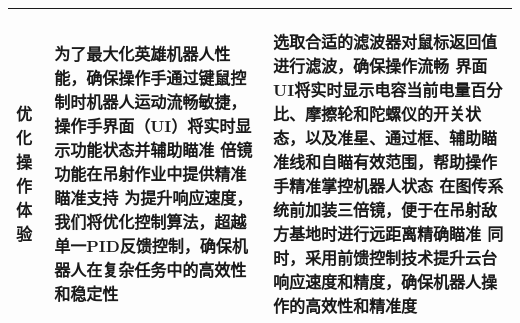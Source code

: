 \begin{longtable}{ p{2cm} | p{7.8cm} | p{6cm} |}
        \begin{center}
            优化操作体验
        \end{center} &
        \begin{center}
            为了最大化英雄机器人性能，确保操作手通过键鼠控制时机器人运动流畅敏捷，操作手界面（UI）将实时显示功能状态并辅助瞄准
            \newline 倍镜功能在吊射作业中提供精准瞄准支持
            \newline 为提升响应速度，我们将优化控制算法，超越单一PID反馈控制，确保机器人在复杂任务中的高效性和稳定性
        \end{center} &
        \begin{center}
            选取合适的滤波器对鼠标返回值进行滤波，确保操作流畅
            \newline 界面UI将实时显示电容当前电量百分比、摩擦轮和陀螺仪的开关状态，以及准星、通过框、辅助瞄准线和自瞄有效范围，帮助操作手精准掌控机器人状态
            \newline 在图传系统前加装三倍镜，便于在吊射敌方基地时进行远距离精确瞄准
            \newline 同时，采用前馈控制技术提升云台响应速度和精度，确保机器人操作的高效性和精准度
        \end{center} \\
        
    \hline
    
\end{longtable}
